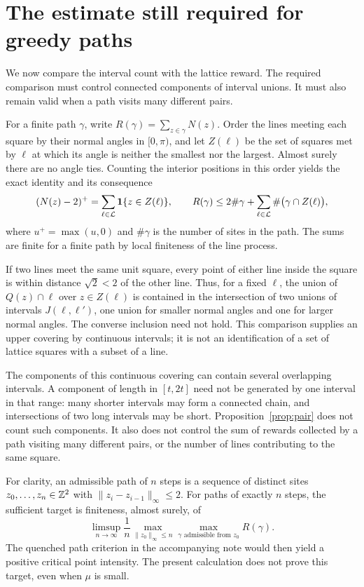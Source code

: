 \documentclass[11pt,letterpaper]{article}
\begin{document}
\section{The estimate still required for greedy paths}

We now compare the interval count with the lattice reward. The required comparison must control connected components of interval unions. It must also remain valid when a path visits many different pairs.

For a finite path $\gamma$, write $R(\gamma)=\sum_{z\in\gamma}N(z)$. Order the lines meeting each square by their normal angles in $[0,\pi)$, and let $Z(\ell)$ be the set of squares met by $\ell$ at which its angle is neither the smallest nor the largest. Almost surely there are no angle ties. Counting the interior positions in this order yields the exact identity and its consequence
\[
 (N(z)-2)^+=\sum_{\ell\in\mathcal L}\mathbf1\{z\in Z(\ell)\},
 \qquad
 R(\gamma)\le2\#\gamma+
             \sum_{\ell\in\mathcal L}\#\big(\gamma\cap Z(\ell)\big),
\]
where $u^+=\max(u,0)$ and $\#\gamma$ is the number of sites in the path. The sums are finite for a finite path by local finiteness of the line process.

If two lines meet the same unit square, every point of either line inside the square is within distance $\sqrt2<2$ of the other line. Thus, for a fixed $\ell$, the union of $Q(z)\cap\ell$ over $z\in Z(\ell)$ is contained in the intersection of two unions of intervals $J(\ell,\ell')$, one union for smaller normal angles and one for larger normal angles. The converse inclusion need not hold. This comparison supplies an upper covering by continuous intervals; it is not an identification of a set of lattice squares with a subset of a line.

The components of this continuous covering can contain several overlapping intervals. A component of length in $[t,2t]$ need not be generated by one interval in that range: many shorter intervals may form a connected chain, and intersections of two long intervals may be short. Proposition~\ref{prop:pair} does not count such components. It also does not control the sum of rewards collected by a path visiting many different pairs, or the number of lines contributing to the same square.

For clarity, an admissible path of $n$ steps is a sequence of distinct sites $z_0,\ldots,z_n\in\mathbb Z^2$ with $\|z_i-z_{i-1}\|_\infty\le2$. For paths of exactly $n$ steps, the sufficient target is finiteness, almost surely, of
\[
 \limsup_{n\to\infty}\frac1n
 \max_{\|z_0\|_\infty\le n}
 \max_{\gamma\text{ admissible from }z_0} R(\gamma).
\]
The quenched path criterion in the accompanying note would then yield a positive critical point intensity. The present calculation does not prove this target, even when $\mu$ is small.
\end{document}
